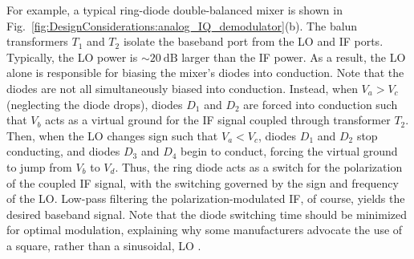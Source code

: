 For example, a typical ring-diode double-balanced mixer
\cite{analog_devices_mix_and_mod}
is shown in Fig.~\ref{fig:DesignConsiderations:analog_IQ_demodulator}(b).
The balun transformers $T_1$ and $T_2$
isolate the baseband port from the LO and IF ports.
Typically, the LO power is $\sim \SI{20}{\deci\bel}$ larger than the IF power.
As a result, the LO alone is responsible
for biasing the mixer's diodes into conduction.
Note that the diodes are not all simultaneously biased into conduction.
Instead, when $V_a > V_c$ (neglecting the diode drops),
diodes $D_1$ and $D_2$ are forced into conduction such that
$V_b$ acts as a virtual ground for the IF signal
coupled through transformer $T_2$.
Then, when the LO changes sign such that $V_a < V_c$,
diodes $D_1$ and $D_2$ stop conducting, and
diodes $D_3$ and $D_4$ begin to conduct,
forcing the virtual ground to jump from $V_b$ to $V_d$.
Thus, the ring diode acts as a switch
for the polarization of the coupled IF signal,
with the switching governed by the sign and frequency of the LO.
Low-pass filtering the polarization-modulated IF, of course,
yields the desired baseband signal.
Note that the diode switching time should be minimized
for optimal modulation,
explaining why some manufacturers
advocate the use of a square, rather than a sinusoidal, LO
\cite{minicircuits_mixer_faqs}.

